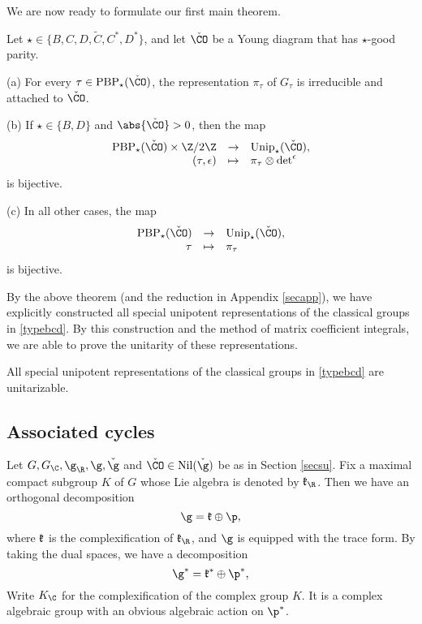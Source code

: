 \documentclass[ssunip.tex]{subfiles}
\begin{document}
We are now ready to formulate our first main theorem.
\begin{thm}\label{thm1}
Let $\star\in \{B, C,D,\widetilde {C}, C^*, D^*\}$, and let $\check \CO$ be a Young diagram that has $\star$-good parity.

\noindent (a) For every $\tau\in \mathrm{PBP}_\star(\check \CO)$, the representation $\pi_\tau$ of $G_\tau$ is irreducible and attached to $\check \CO$.

\noindent  (b) If $\star\in \{B,D\}$ and $\abs{\check \CO}>0$, then the map
\[
\begin{array}{rcl}
\mathrm{PBP}_\star(\check \CO)\times \Z/2\Z&\rightarrow &\mathrm{Unip}_{\star}(\check \CO),\\
  (\tau, \epsilon)&\mapsto& \pi_\tau\otimes \det^\epsilon
  \end{array}
\]
is bijective.

\noindent
(c) In all other cases, the map
\[
\begin{array}{rcl}
\mathrm{PBP}_\star(\check \CO)&\rightarrow &\mathrm{Unip}_{\star}(\check \CO),\\
  \tau&\mapsto& \pi_\tau
  \end{array}
\]
is bijective.
\end{thm}

By the above theorem (and the reduction in Appendix \ref{secapp}), we have explicitly constructed all special unipotent representations of the classical groups in \eqref{typebcd}. By this construction and the method of matrix coefficient integrals, we are able to prove the unitarity of these representations.

\begin{thm}
All special unipotent representations of the classical groups in \eqref{typebcd} are unitarizable.
\end{thm}

\subsection{Associated cycles}
Let $G,  G_\C, \g_\R, \g, \check \g$ and $\check \CO \in \mathrm{Nil}(\check \g)$ be as in Section \ref{secsu}. Fix a maximal compact subgroup $K$ of $G$ whose Lie algebra is denoted by $\frak k_\R$. Then we have an orthogonal decomposition
\[
  \g=\frak k\oplus \p,
\]
where $\frak k$ is the complexification of $\frak k_\R$, and $\g$ is equipped with the trace form. By taking the dual spaces, we have a
decomposition
\[
  \g^*=\frak k^*\oplus \p^*,
\]
Write $K_\C$ for the complexification of the complex group $K$. It is a complex algebraic group with an obvious algebraic action on $\p^*$.
\end{document}

